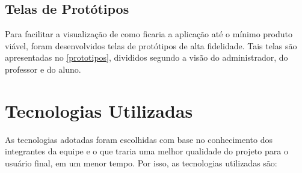 \documentclass[
    12pt,               %
    openright,          %
    oneside,
    a4paper,            %
    english,            %
    brazil              %
    ]{ifsp-spo-inf-ctds} %
\begin{document}
\subsection{Telas de Protótipos}
Para facilitar a visualização de como ficaria a aplicação até o mínimo produto viável, foram desenvolvidos telas de protótipos de alta fidelidade. Tais telas são apresentadas no \autoref{prototipos}, divididos segundo a visão do administrador, do professor e do aluno.


\section{Tecnologias Utilizadas}
As tecnologias adotadas foram escolhidas com base no conhecimento dos integrantes da equipe e o que traria uma melhor qualidade do projeto para o usuário final, em um menor tempo. Por isso, as tecnologias utilizadas são:
\end{document}
